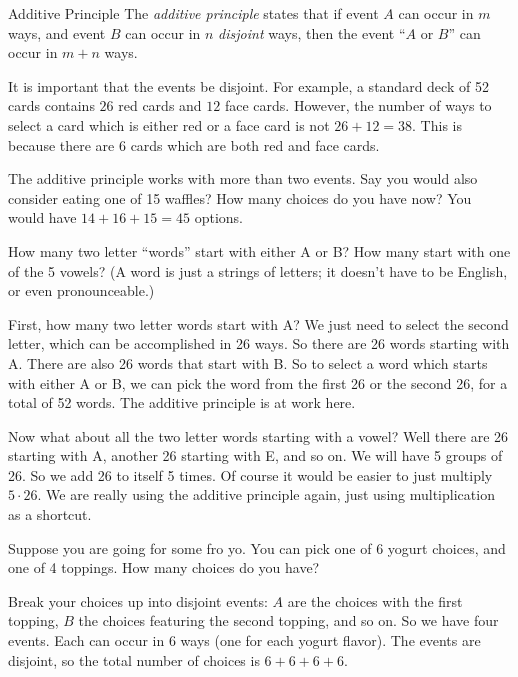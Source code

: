 \documentclass[12pt]{article}
\begin{document}
\begin{defbox}{Additive Principle}
  The {\em additive principle} states that if event $A$ can occur in $m$ ways, and event $B$ can occur in $n$ {\em disjoint} ways, then the event ``$A$ or $B$'' can occur in $m + n$ ways.  
\end{defbox}

It is important that the events be disjoint.  For example, a standard deck of 52 cards contains $26$ red cards and $12$ face cards.  However, the number of ways to select a card which is either red or a face card is not $26 + 12 = 38$.  This is because there are 6 cards which are both red and face cards.

The additive principle works with more than two events.  Say you would also consider eating one of 15 waffles?  How many choices do you have now?  You would have $14 + 16 + 15 = 45$ options.

\begin{example}
  How many two letter ``words'' start with either A or B?  How many start with one of the 5 vowels?  (A word is just a strings of letters; it doesn't have to be English, or even pronounceable.)
  
  \begin{solution}
    First, how many two letter words start with A?  We just need to select the second letter, which can be accomplished in 26 ways.  So there are 26 words starting with A.  There are also 26 words that start with B.  So to select a word which starts with either A or B, we can pick the word from the first 26 or the second 26, for a total of 52 words.  The additive principle is at work here.
    
    Now what about all the two letter words starting with a vowel?  Well there are 26 starting with A, another 26 starting with E, and so on.  We will have 5 groups of 26.  So we add 26 to itself 5 times.  Of course it would be easier to just multiply $5\cdot 26$.  We are really using the additive principle again, just using multiplication as a shortcut.
  \end{solution}

\end{example}

\begin{example}
  Suppose you are going for some fro yo.  You can pick one of 6 yogurt choices, and one of 4 toppings.  How many choices do you have?  
  
  \begin{solution}
    Break your choices up into disjoint events:  $A$ are the choices with the first topping, $B$ the choices featuring the second topping, and so on.  So we have four events.  Each can occur in 6 ways (one for each yogurt flavor).  The events are disjoint, so the total number of choices is $6 + 6 + 6 + 6$.
  \end{solution}


\end{example}
\end{document}

